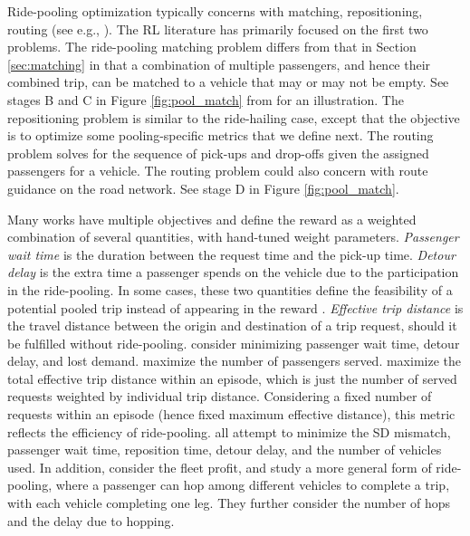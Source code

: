 \documentclass{article}
\newcommand{\tq}[1]{\textcolor{red}{#1}}
\begin{document}
Ride-pooling optimization typically concerns with matching, repositioning, routing (see e.g., \citep{zheng2018order,alonso2017predictive,alonso2017demand,tong2018unified}). The RL literature  has primarily focused on the first two problems. The ride-pooling matching problem differs from that in Section \ref{sec:matching} in that a combination of multiple passengers, and hence their combined trip, can be matched to a vehicle that may or may not be empty. See stages B and C in Figure \ref{fig:pool_match} from \citep{alonso2017demand} for an illustration. The repositioning problem is similar to the ride-hailing case, except that the objective is to optimize some pooling-specific metrics that we define next. The routing problem solves for the sequence of pick-ups and drop-offs given the assigned passengers for a vehicle. The routing problem could also concern with route guidance on the road network. See stage D in Figure \ref{fig:pool_match}.

Many works have multiple objectives and define the reward as a weighted combination of several quantities, with hand-tuned weight parameters. \emph{Passenger wait time} is the duration between the request time and the pick-up time. \emph{Detour delay} is the extra time a passenger spends on the vehicle due to the participation in the ride-pooling. In some cases, these two quantities define the feasibility of a potential pooled trip instead of appearing in the reward \citep{shah2020neural}.
\emph{Effective trip distance} is the travel distance between the origin and destination of a trip request, should it be fulfilled without ride-pooling. \cite{yu2019integrated} consider minimizing passenger wait time, detour delay, and lost demand. 
\cite{gueriau2018samod} maximize the number of passengers served. \cite{jindal2018optimizing} maximize the total effective trip distance within an episode, which is just the number of served requests weighted by individual trip distance. Considering a fixed number of requests within an episode (hence fixed maximum effective distance), this metric reflects the efficiency of ride-pooling.  \cite{al2019deeppool,haliem2020dprs,singh2019distributed,haliem2020distributed} all attempt to minimize the SD mismatch, passenger wait time, reposition time, detour delay, and the number of vehicles used. 
In addition, \cite{haliem2020dprs} consider the fleet profit, and 
\cite{singh2019distributed} study a more general form of ride-pooling, where a passenger can hop among different vehicles to complete a trip, with each vehicle completing one leg. They further consider the number of hops and the delay due to hopping.
\end{document}
